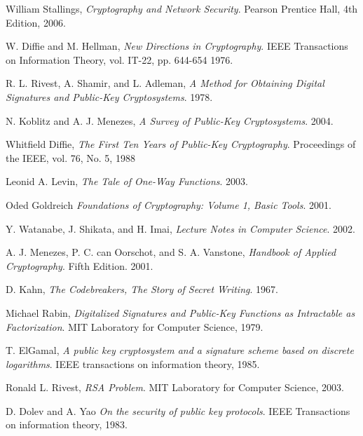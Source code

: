 \documentclass[english,titlepage,11pt]{article}
\begin{document}
\begin{thebibliography}{9}

  William Stallings,
  \emph{Cryptography and Network Security}.
  Pearson Prentice Hall,
  4th Edition,
  2006.
  
  W. Diffie and M. Hellman,
  \emph{New Directions in Cryptography}.
  IEEE Transactions on Information Theory, vol. IT-22, pp. 644-654
  1976.

  R. L. Rivest, A. Shamir, and L. Adleman,
  \emph{A Method for Obtaining Digital Signatures and Public-Key Cryptosystems}.
  1978.

  N. Koblitz and A. J. Menezes,
  \emph{A Survey of Public-Key Cryptosystems}.
  2004.

  Whitfield Diffie,
  \emph{The First Ten Years of Public-Key Cryptography}.
  Proceedings of the IEEE, vol. 76, No. 5,
  1988

  Leonid A. Levin,
  \emph{The Tale of One-Way Functions}.
  2003.

  Oded Goldreich
  \emph{Foundations of Cryptography: Volume 1, Basic Tools}.
  2001.

  Y. Watanabe, J. Shikata, and H. Imai,
  \emph{Lecture Notes in Computer Science}.
  2002.

  A. J. Menezes, P. C. can Oorschot, and S. A. Vanstone,
  \emph{Handbook of Applied Cryptography}.
  Fifth Edition.
  2001.

  D. Kahn, 
  \emph{The Codebreakers, The Story of Secret Writing}.
  1967.

  Michael Rabin,
  \emph{Digitalized Signatures and Public-Key Functions as Intractable as Factorization}. 
  MIT Laboratory for Computer Science,
	1979.

  T. ElGamal,
  \emph{A public key cryptosystem and a signature scheme based on discrete logarithms}.
	IEEE transactions on information theory, 
	1985.

  Ronald L. Rivest,
	\emph{RSA Problem}.
	MIT Laboratory for Computer Science,
	2003.

	D. Dolev and A. Yao
	\emph{On the security of public key protocols}.
	IEEE Transactions on information theory, 
	1983.

\end{thebibliography}
\end{document}
